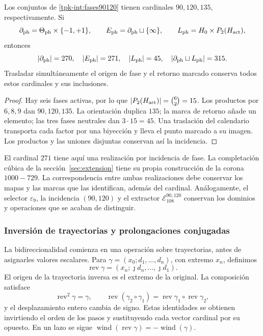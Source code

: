 \begin{proposition}
\label{tpk-int:cardinales}
Los conjuntos de \eqref{tpk-int:fases90120} tienen cardinales
\(90,120,135\), respectivamente. Si
\[
 \partial_{\rm ph}=\Theta_{\rm ph}\times\{-1,+1\},\qquad
 E_{\rm ph}=\partial_{\rm ph}\sqcup\{\infty\},\qquad
 L_{\rm ph}=H_0\times P_2(H_{\rm act}),
\]
entonces
\[
 |\partial_{\rm ph}|=270,\quad |E_{\rm ph}|=271,\quad
 |L_{\rm ph}|=45,\quad
 |\partial_{\rm ph}\sqcup L_{\rm ph}|=315.
\]
Trasladar simultáneamente el origen de fase y el retorno marcado conserva
todos estos cardinales y sus inclusiones.
\end{proposition}
\begin{proof}
Hay seis fases activas, por lo que
\(|P_2(H_{\rm act})|=\binom62=15\). Los productos por
\(6,8,9\) dan \(90,120,135\). La orientación duplica \(135\);
la marca de retorno añade un elemento; las tres fases neutrales dan
\(3\cdot15=45\). Una traslación del calendario transporta cada
factor por una biyección y lleva el punto marcado a su imagen. Los
productos y las uniones disjuntas conservan así la incidencia.
\end{proof}

El cardinal \(271\) tiene aquí una realización por incidencia de
fase. La completación cúbica de la sección~\ref{sec:extension} tiene
su propia construcción de la corona \(1000-729\). La correspondencia
entre ambas realizaciones debe conservar los mapas y las marcas que las
identifican, además del cardinal. Análogamente, el selector
\(\varepsilon_9\), la incidencia \((90,120)\) y el extractor
\(\mathcal E_{108}^{90,120}\) conservan los dominios y operaciones
que se acaban de distinguir.

\subsubsection{Inversión de trayectorias y prolongaciones conjugadas}
\label{tpk-int:bidireccionalidad}

La bidireccionalidad comienza en una operación sobre trayectorias, antes
de asignarles valores escalares. Para
\(\gamma=(x_0;d_1,\ldots,d_n)\), con extremo \(x_n\), definimos
\[
 \operatorname{rev}\gamma
   =(x_n;\jmath d_n,\ldots,\jmath d_1).
\]
El origen de la trayectoria inversa es el extremo de la original.
La composición satisface
\[
 \operatorname{rev}^2\gamma=\gamma,\qquad
 \operatorname{rev}(\gamma_2\circ\gamma_1)
   =\operatorname{rev}\gamma_1\circ\operatorname{rev}\gamma_2,
\]
y el desplazamiento entero cambia de signo. Estas identidades se obtienen
invirtiendo el orden de los pasos y sustituyendo cada vector cardinal por
su opuesto. En un lazo se sigue
\(\operatorname{wind}(\operatorname{rev}\gamma)
=-\operatorname{wind}(\gamma)\).

